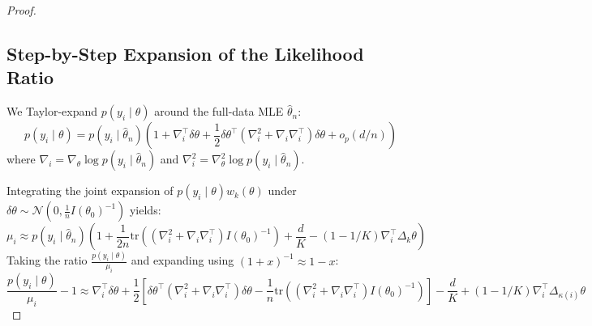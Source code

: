 \documentclass[12pt]{article}
\begin{document}
\begin{proof}
\subsection{Step-by-Step Expansion of the Likelihood Ratio}
We Taylor-expand $p(y_i \mid \theta)$ around the full-data MLE $\hat{\theta}_n$:
\[
p(y_i \mid \theta) = p(y_i \mid \hat{\theta}_n) \left( 1 + \nabla_i^\top \delta\theta + \frac{1}{2} \delta\theta^\top (\nabla^2_i + \nabla_i \nabla_i^\top) \delta\theta + o_p(d/n) \right)
\]
where $\nabla_i = \nabla_\theta \log p(y_i \mid \hat{\theta}_n)$ and $\nabla^2_i = \nabla^2_\theta \log p(y_i \mid \hat{\theta}_n)$.

Integrating the joint expansion of $p(y_i \mid \theta) w_k(\theta)$ under $\delta\theta \sim \mathcal{N}(0, \frac{1}{n} I(\theta_0)^{-1})$ yields:
\[
\mu_i \approx p(y_i \mid \hat{\theta}_n) \left( 1 + \frac{1}{2n} \text{tr}\left( (\nabla^2_i + \nabla_i \nabla_i^\top) I(\theta_0)^{-1} \right) + \frac{d}{K} - (1-1/K) \nabla_i^\top \Delta_k \theta \right)
\]
Taking the ratio $\frac{p(y_i \mid \theta)}{\mu_i}$ and expanding using $(1+x)^{-1} \approx 1 - x$:
\[
\frac{p(y_i \mid \theta)}{\mu_i} - 1 \approx \nabla_i^\top \delta\theta + \frac{1}{2} \left[ \delta\theta^\top (\nabla^2_i + \nabla_i \nabla_i^\top) \delta\theta - \frac{1}{n} \text{tr}\left( (\nabla^2_i + \nabla_i \nabla_i^\top) I(\theta_0)^{-1} \right) \right] - \frac{d}{K} + (1-1/K) \nabla_i^\top \Delta_{\kappa(i)} \theta
\]


\end{proof}
\end{document}
